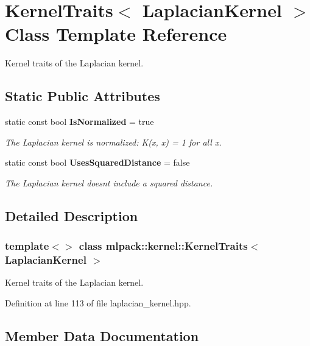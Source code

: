 \section{Kernel\+Traits$<$ Laplacian\+Kernel $>$ Class Template Reference}
\label{classmlpack_1_1kernel_1_1KernelTraits_3_01LaplacianKernel_01_4}


Kernel traits of the Laplacian kernel.  


\subsection*{Static Public Attributes}
\begin{DoxyCompactItemize}
\item 
static const bool \textbf{ Is\+Normalized} = true
\begin{DoxyCompactList}\small\item\em The Laplacian kernel is normalized\+: K(x, x) = 1 for all x. \end{DoxyCompactList}\item 
static const bool \textbf{ Uses\+Squared\+Distance} = false
\begin{DoxyCompactList}\small\item\em The Laplacian kernel doesn\textquotesingle{}t include a squared distance. \end{DoxyCompactList}\end{DoxyCompactItemize}


\subsection{Detailed Description}
\subsubsection*{template$<$$>$\newline
class mlpack\+::kernel\+::\+Kernel\+Traits$<$ Laplacian\+Kernel $>$}

Kernel traits of the Laplacian kernel. 

Definition at line 113 of file laplacian\+\_\+kernel.\+hpp.



\subsection{Member Data Documentation}
\mbox{\label{classmlpack_1_1kernel_1_1KernelTraits_3_01LaplacianKernel_01_4_a213c74e1e7c01890b64c8b9e88f8c0dc}} 
